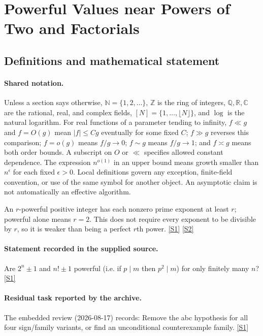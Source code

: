 \documentclass[11pt,a4paper]{article}
\newcommand{\N}{\mathbb{N}}
\newcommand{\Z}{\mathbb{Z}}
\newcommand{\Q}{\mathbb{Q}}
\newcommand{\R}{\mathbb{R}}
\newcommand{\C}{\mathbb{C}}
\newcommand{\sref}[2]{\hyperlink{source:#1:#2}{[S#2]}}
\begin{document}
\section{Powerful Values near Powers of Two and Factorials}\label{statement}


\subsection{Definitions and mathematical statement}

\paragraph{Shared notation.}Unless a section says otherwise, $\N=\{1,2,\ldots\}$,
$\Z$ is the ring of integers, $\Q,\R,\C$ are the rational, real, and complex
fields, $[N]=\{1,\ldots,\lfloor N\rfloor\}$, and $\log$ is the natural
logarithm. For real functions of a parameter tending to infinity,
$f\ll g$ and $f=O(g)$ mean $|f|\leq Cg$ eventually for some fixed $C$;
$f\gg g$ reverses this comparison; $f=o(g)$ means $f/g\to0$;
$f\sim g$ means $f/g\to1$; and $f\asymp g$ means both order bounds.
A subscript on $O$ or $\ll$ specifies allowed constant dependence.
The expression $n^{o(1)}$ in an upper bound means growth smaller than
$n^\epsilon$ for each fixed $\epsilon>0$. Local definitions govern any
exception, finite-field convention, or use of the same symbol for another
object. An asymptotic claim is not automatically an effective algorithm.



An $r$-powerful positive integer has each nonzero prime exponent at least $r$; powerful alone means $r=2$. This does not require every exponent to be divisible by $r$, so it is weaker than being a perfect $r$th power. \sref{statement}{1} \sref{statement}{2}

\paragraph{Statement recorded in the supplied source.}
Are $ 2^n\pm 1 $ and $ n!\pm 1 $ powerful (i.e. if $p\mid m$ then $p^2\mid m$) for only finitely many $n$? \sref{statement}{1}

\paragraph{Residual task reported by the archive.}

The embedded review (2026-08-17) records: Remove the abc hypothesis for all four sign/family variants, or find an unconditional counterexample family. \sref{statement}{1}
\end{document}
